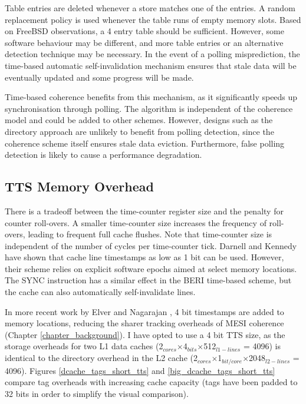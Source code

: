 		Table entries are deleted whenever a store matches one of the entries. A random replacement policy is used whenever the table runs of empty memory slots. Based on FreeBSD observations, a 4 entry table should be sufficient. 
		However, some software behaviour may be different, and more table entries or an alternative detection technique may be necessary.
		In the event of a polling misprediction, the time-based automatic self-invalidation mechanism ensures that stale data will be eventually updated and some progress will be made.
		
		Time-based coherence benefits from this mechanism, as it significantly speeds up synchronisation through polling.
		The algorithm is independent of the coherence model and could be added to other schemes.
		However, designs such as the directory approach are unlikely to benefit from polling detection, since the coherence scheme itself ensures stale data eviction.
		Furthermore, false polling detection is likely to cause a performance degradation.
	

	\subsection{TTS Memory Overhead}
		\label{tts_memory_overhead}
		There is a tradeoff between the time-counter register size and the penalty for counter roll-overs. A smaller time-counter size increases the frequency of roll-overs, leading to frequent full cache flushes. Note that time-counter size is independent of the number of cycles per time-counter tick. 
		Darnell and Kennedy \cite{Darnell93} have shown that cache line timestamps as low as 1 bit can be used. However, their scheme relies on explicit software epochs aimed at select memory locations. The SYNC instruction has a similar effect in the BERI time-based scheme, but the cache can also automatically self-invalidate lines. 
		
		In more recent work by Elver and Nagarajan \cite{Elver14}, 4 bit timestamps are added to memory locations, reducing the sharer tracking overheads of MESI coherence (Chapter \ref{chapter_background}). I have opted to use a 4 bit TTS size, as the storage overheads for two L1 data caches (2$_{cores}$$\times$4$_{bits}$$\times$512$_{l1-lines}$ = 4096) is identical to the directory overhead in the L2 cache (2$_{cores}$$\times$1$_{bit/core}$$\times$2048$_{l2-lines}$ = 4096). Figures \ref{dcache_tags_short_tts} and \ref{big_dcache_tags_short_tts} compare tag overheads with increasing cache capacity (tags have been padded to 32 bits in order to simplify the visual comparison). 
		
